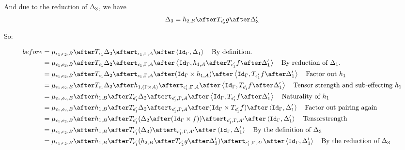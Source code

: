 {                And due to the reduction of $\Delta_3$,
                we have 
                \begin{equation}
                    \D_3 = h_{2, B} \after \T{\e_2'}{g}\after \D_3'
                \end{equation}

                So:

                \begin{align}
                    before &= \bind{\e_1}{\e_2}{B}\after \T{\e_1}{\D_2}\after\tstrength{\e_1}{\G}{A}\after\pr{\idg}{\D_1}\qt{By definition.}\\
                    &= \bind{\e_1}{\e_2}{B}\after \T{\e_1}{\D_2}\after\tstrength{\e_1}{\G}{A}\after\pr{\idg}{h_{1, A}\after\T{\e_1'}{f}\after\D_1'}\qt{By reduction of $\D_1$.}\\
                    &= \bind{\e_1}{\e_2}{B}\after \T{\e_1}{\D_2}\after\tstrength{\e_1}{\G}{A}\after(\idg\times h_{1, A})\after\pr{\idg}{\T{\e_1'}{f}\after\D_1'}\qt{Factor out $h_1$}\\
                    &= \bind{\e_1}{\e_2}{B}\after \T{\e_1}{\D_2}\after
                    h_{1, (\G\times A)}\after
                    \tstrength{\e_1'}{\G}{A}\after\pr{\idg}{\T{\e_1'}{f}\after\D_1'}\qt{Tensor strength and sub-effecting $h_1$}\\
                    &= \bind{\e_1}{\e_2}{B}\after 
                    h_{1, B}\after\T{\e_1'}{\D_2}\after
                    \tstrength{\e_1'}{\G}{A}\after\pr{\idg}{\T{\e_1'}{f}\after\D_1'}\qt{Naturality of $h_1$}\\
                    &= \bind{\e_1}{\e_2}{B}\after 
                    h_{1, B}\after\T{\e_1'}{\D_2}\after
                    \tstrength{\e_1'}{\G}{A}\after(\idg\times \T{\e_1'}{f})\after\pr{\idg}{\D_1'}\qt{Factor out pairing again}\\
                    &= \bind{\e_1}{\e_2}{B}\after 
                    h_{1, B}\after\T{\e_1'}{(\D_2\after(\idg\times f))}\after
                    \tstrength{\e_1'}{\G}{A'}\after\pr{\idg}{\D_1'}\qt{Tensorstrength}\\
                    &= \bind{\e_1}{\e_2}{B}\after 
                    h_{1, B}\after\T{\e_1'}{(\D_3)}\after
                    \tstrength{\e_1'}{\G}{A'}\after\pr{\idg}{\D_1'}\qt{By the definition of $\D_3$}\\
                    &= \bind{\e_1}{\e_2}{B}\after 
                    h_{1, B}\after\T{\e_1'}{(h_{2, B}\after\T{\e_2'}{g}\after \D_3')}\after
                    \tstrength{\e_1'}{\G}{A'}\after\pr{\idg}{\D_1'}\qt{By the reduction of $\D_3$}\\

\end{align}}
